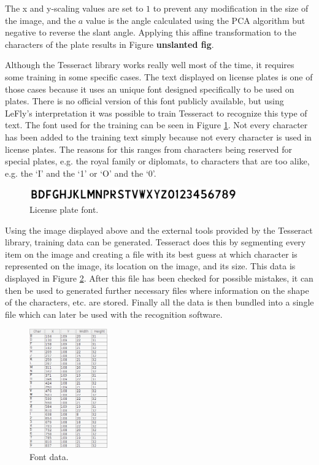 The x and y-scaling values are set to $1$ to prevent any modification in the size of the image, and the $a$ value is the angle calculated using the PCA algorithm but negative to reverse the slant angle. Applying this affine transformation to the characters of the plate results in Figure \textbf{unslanted fig}.


Although the Tesseract library works really well most of the time, it requires some training in some specific cases. The text displayed on license plates is one of those cases because it uses an unique font designed specifically to be used on plates. There is no official version of this font publicly available, but using LeFly's \cite{lefly} interpretation it was possible to train Tesseract to recognize this type of text. The font used for the training can be seen in Figure \ref{fig:plate-font}. Not every character has been added to the training text simply because not every character is used in license plates. The reasons for this ranges from characters being reserved for special plates, e.g. the royal family or diplomats, to characters that are too alike, e.g. the `I' and the `1' or `O' and the `0'.

\begin{figure}[ht]
    \centering
    \includegraphics[width=0.8\textwidth]{plaatjes/font}
    \caption{License plate font.}
    \label{fig:plate-font}
\end{figure}%

Using the image displayed above and the external tools provided by the Tesseract library, training data can be generated. Tesseract does this by segmenting every item on the image and creating a file with its best guess at which character is represented on the image, its location on the image, and its size. This data is displayed in Figure \ref{fig:text-data}. After this file has been checked for possible mistakes, it can then be used to generated further necessary files where information on the shape of the characters, etc. are stored. Finally all the data is then bundled into a single file which can later be used with the recognition software.

\begin{figure}[ht]
    \centering
    \includegraphics[width=0.3\textwidth]{plaatjes/text-data}
    \caption{Font data.}
    \label{fig:text-data}
\end{figure}%